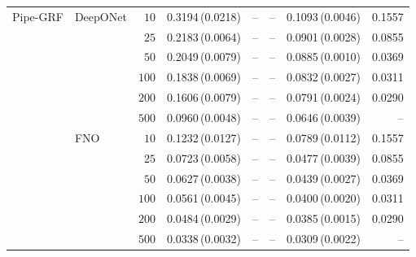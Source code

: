 \documentclass{article}
\begin{document}
{\begin{longtable}{llrrrrrr}
Pipe-GRF & DeepONet & $10$ & 0.3194\,(0.0218) & -- & -- & 0.1093\,(0.0046) & 0.1557\\
 &  & $25$ & 0.2183\,(0.0064) & -- & -- & 0.0901\,(0.0028) & 0.0855\\
 &  & $50$ & 0.2049\,(0.0079) & -- & -- & 0.0885\,(0.0010) & 0.0369\\
 &  & $100$ & 0.1838\,(0.0069) & -- & -- & 0.0832\,(0.0027) & 0.0311\\
 &  & $200$ & 0.1606\,(0.0079) & -- & -- & 0.0791\,(0.0024) & 0.0290\\
 &  & $500$ & 0.0960\,(0.0048) & -- & -- & 0.0646\,(0.0039) & --\\
 & FNO & $10$ & 0.1232\,(0.0127) & -- & -- & 0.0789\,(0.0112) & 0.1557\\
 &  & $25$ & 0.0723\,(0.0058) & -- & -- & 0.0477\,(0.0039) & 0.0855\\
 &  & $50$ & 0.0627\,(0.0038) & -- & -- & 0.0439\,(0.0027) & 0.0369\\
 &  & $100$ & 0.0561\,(0.0045) & -- & -- & 0.0400\,(0.0020) & 0.0311\\
 &  & $200$ & 0.0484\,(0.0029) & -- & -- & 0.0385\,(0.0015) & 0.0290\\
 &  & $500$ & 0.0338\,(0.0032) & -- & -- & 0.0309\,(0.0022) & --\\
\end{longtable}
}
\vspace{-3mm}
\end{document}
